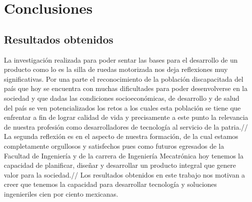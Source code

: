 
\chapter{Conclusiones} %

\label{Chapter5} %




\section{Resultados obtenidos}
La investigaci\'on realizada para poder sentar las bases para el desarrollo de un producto como lo es la silla de ruedas motorizada nos deja reflexiones muy significativas. Por una parte el reconocimiento de la poblaci\'on discapacitada del pa\'is que hoy se encuentra con muchas dificultades para poder desenvolverse en la sociedad y que dadas las condiciones socioecon\'omicas, de desarrollo y de salud del pa\'is se ven potencializados los retos a los cuales esta poblaci\'on se tiene que enfrentar a fin de lograr calidad de vida y precisamente a este punto la relevancia de nuestra profesi\'on como desarrolladores de tecnolog\'ia al servicio de la patria.//
La segunda reflexi\'on es en el aspecto de nuestra formaci\'on, de la cual estamos completamente orgullosos y satisfechos pues como futuros egresados de la Facultad de Ingenier\'ia y de la carrera de Ingenier\'ia Mecatr\'onica hoy tenemos la capacidad de planificar, diseñar y desarrollar un producto integral que genere valor para la sociedad.//
Los resultados obtenidos en este trabajo nos motivan a creer que tenemos la capacidad para desarrollar tecnolog\'ia y soluciones ingenieriles cien por ciento mexicanas.
